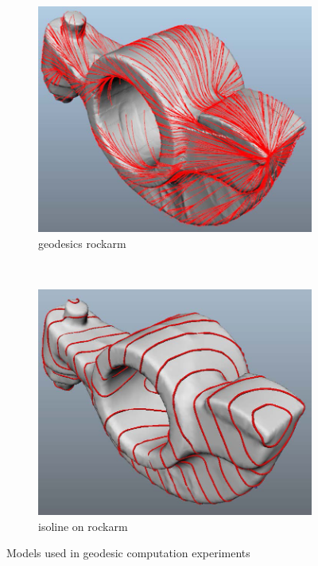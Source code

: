  \begin{figure}
 		\ContinuedFloat
        \centering       
        
         \begin{subfigure}[b]{0.5\textwidth}
                \includegraphics[width=\textwidth]{../images/geodesic_image/rock_arm}
                \caption{geodesics rockarm}
                \label{fig:rockarm}
        \end{subfigure}%
        ~
        \begin{subfigure}[b]{0.5\textwidth}
                \includegraphics[width=\textwidth]{../images/geodesic_image/rocker_arm_isoline}
                \caption{isoline on rockarm}
                \label{fig:rockarm_iso}
        \end{subfigure}%
		 
	
        \caption{Models used in geodesic computation experiments}
        \label{fig:geodesic_result}       
\end{figure}

